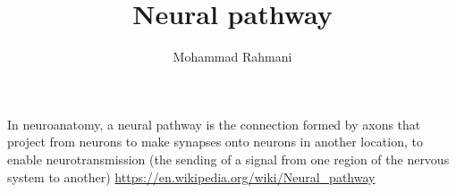\documentclass[a4paper]{article}
\title{Neural pathway}
\date{}
\author{Mohammad Rahmani}
\begin{document}
    \maketitle
    In neuroanatomy, a neural pathway is the connection formed by axons that project from neurons to make synapses onto neurons in another location, to enable neurotransmission (the sending of a signal from one region of the nervous system to another)   \url{https://en.wikipedia.org/wiki/Neural_pathway}
    
    
\end{document}
